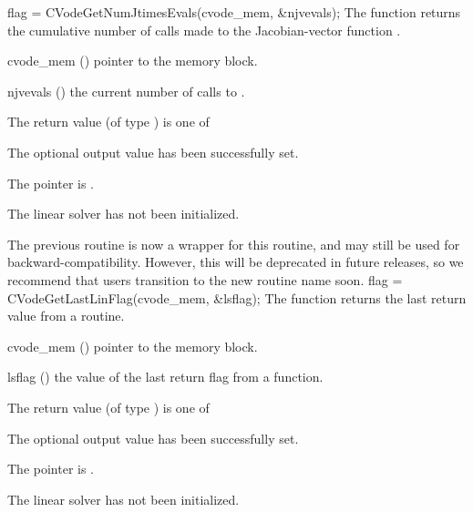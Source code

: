 {
  flag = CVodeGetNumJtimesEvals(cvode\_mem, \&njvevals);
}
{
  The function  returns the
  cumulative number of calls made to the Jacobian-vector function
  .
}
{
  \begin{args}
  \item[cvode\_mem] ()
    pointer to the {\cvode} memory block.
  \item[njvevals] ()
    the current number of calls to .
  \end{args}
}
{
  The return value  (of type ) is one of
  \begin{args}
  \item[\Id{CVLS\_SUCCESS}]
    The optional output value has been successfully set.
  \item[\Id{CVLS\_MEM\_NULL}]
    The  pointer is .
  \item[\Id{CVLS\_LMEM\_NULL}]
    The {\cvls} linear solver has not been initialized.
  \end{args}
}
{
  The previous routine  is now a wrapper for
  this routine, and may still be used for backward-compatibility.
  However, this will be deprecated in future releases, so we recommend
  that users transition to the new routine name soon.
}
{
  flag = CVodeGetLastLinFlag(cvode\_mem, \&lsflag);
}
{
  The function  returns the
  last return value from a {\cvls} routine.
}
{
  \begin{args}
  \item[cvode\_mem] ()
    pointer to the {\cvode} memory block.
  \item[lsflag] ()
    the value of the last return flag from a {\cvls} function.
  \end{args}
}
{
  The return value  (of type ) is one of
  \begin{args}
  \item[\Id{CVLS\_SUCCESS}]
    The optional output value has been successfully set.
  \item[\Id{CVLS\_MEM\_NULL}]
    The  pointer is .
  \item[\Id{CVLS\_LMEM\_NULL}]
    The {\cvls} linear solver has not been initialized.
  \end{args}
}
